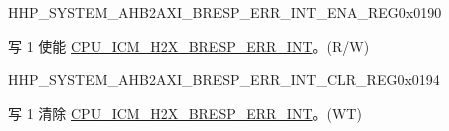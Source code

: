 \begin{register}{H}{HP\_SYSTEM\_AHB2AXI\_BRESP\_ERR\_INT\_ENA\_REG}{0x0190}\label{regdesc:HPSYSTEMAHB2AXIBRESPERRINTENAREG}
%
%
\regnewline%
\begin{regdesc}\begin{reglist}
\label{fielddesc:HPSYSTEMCPUICMH2XBRESPERRINTENA}\item [HP\_SYSTEM\_CPU\_ICM\_H2X\_BRESP\_ERR\_INT\_ENA] 写 1 使能 \hyperref[tab:sysreg-int-sources]{CPU\_ICM\_H2X\_BRESP\_ERR\_INT}。(R/W)
\end{reglist}\end{regdesc}
\end{register}


\begin{register}{H}{HP\_SYSTEM\_AHB2AXI\_BRESP\_ERR\_INT\_CLR\_REG}{0x0194}\label{regdesc:HPSYSTEMAHB2AXIBRESPERRINTCLRREG}
%
%
\regnewline%
\begin{regdesc}\begin{reglist}
\label{fielddesc:HPSYSTEMCPUICMH2XBRESPERRINTCLR}\item [HP\_SYSTEM\_CPU\_ICM\_H2X\_BRESP\_ERR\_INT\_CLR] 写 1 清除 \hyperref[tab:sysreg-int-sources]{CPU\_ICM\_H2X\_BRESP\_ERR\_INT}。(WT)
\end{reglist}\end{regdesc}
\end{register}


